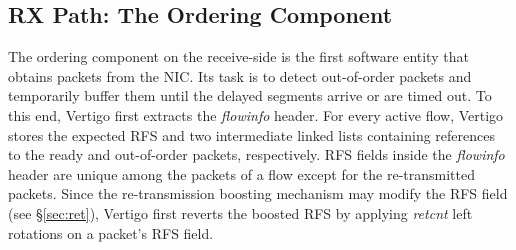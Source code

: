 
    




\subsection{RX Path: The Ordering Component}
\label{sec:ordering}

The ordering component on the receive-side is the first software entity that obtains packets from the NIC. Its task is to detect out-of-order packets and temporarily buffer them until the delayed segments arrive or are timed out. To this end, Vertigo first extracts the \textit{flowinfo} header. For every active flow, Vertigo stores the expected RFS and two intermediate linked lists containing references to the ready and out-of-order packets, respectively. RFS fields inside the \textit{flowinfo} header are unique among the packets of a flow except for the re-transmitted packets. Since the re-transmission boosting mechanism may modify the RFS field (see \S\ref{sec:ret}), Vertigo first reverts the boosted RFS by applying \textit{retcnt} left rotations on a packet's RFS field. 


